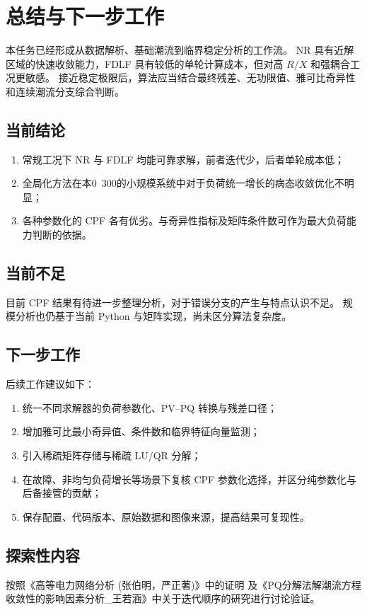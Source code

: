 \section{总结与下一步工作}
\label{sec:conclusion}

本任务已经形成从数据解析、基础潮流到临界稳定分析的工作流。
NR 具有近解区域的快速收敛能力，FDLF 具有较低的单轮计算成本，但对高 $R/X$ 和强耦合工况更敏感。
接近稳定极限后，算法应当结合最终残差、无功限值、雅可比奇异性和连续潮流分支综合判断。

\subsection{当前结论}

\begin{enumerate}
  \item 常规工况下 NR 与 FDLF 均能可靠求解，前者迭代少，后者单轮成本低；
  \item 全局化方法在本0~300的小规模系统中对于负荷统一增长的病态收敛优化不明显；
  \item 各种参数化的 CPF 各有优劣。与奇异性指标及矩阵条件数可作为最大负荷能力判断的依据。
\end{enumerate}

\subsection{当前不足}

目前 CPF 结果有待进一步整理分析，对于错误分支的产生与特点认识不足。
规模分析也仍基于当前 Python 与矩阵实现，尚未区分算法复杂度。

\subsection{下一步工作}

后续工作建议如下：
\begin{enumerate}
  \item 统一不同求解器的负荷参数化、PV--PQ 转换与残差口径；
  \item 增加雅可比最小奇异值、条件数和临界特征向量监测；
  \item 引入稀疏矩阵存储与稀疏 LU/QR 分解；
  \item 在故障、非均匀负荷增长等场景下复核 CPF 参数化选择，并区分纯参数化与后备接管的贡献；
  \item 保存配置、代码版本、原始数据和图像来源，提高结果可复现性。
\end{enumerate}


\subsection{探索性内容}

按照《高等电力网络分析 (张伯明，严正著)》中的证明
及《PQ分解法解潮流方程收敛性的影响因素分析_王若涵》中关于迭代顺序的研究进行讨论验证。